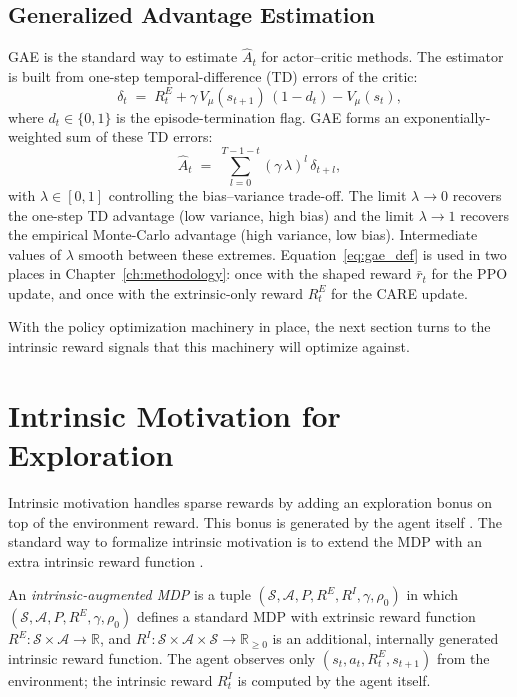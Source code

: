 \subsection{Generalized Advantage Estimation}
\label{sec:gae_background}

GAE \cite{schulman2016gae} is the standard way to estimate $\hat A_t$ for actor--critic methods. The estimator is built from one-step temporal-difference (TD) errors of the critic:
\begin{equation}
\delta_t \;=\; R_t^E + \gamma\, V_\mu(s_{t+1})\,(1 - d_t) - V_\mu(s_t),
\label{eq:td_error}
\end{equation}
where $d_t \in \{0, 1\}$ is the episode-termination flag. GAE forms an exponentially-weighted sum of these TD errors:
\begin{equation}
\hat A_t \;=\; \sum_{l=0}^{T-1-t} (\gamma\, \lambda)^l\, \delta_{t+l},
\label{eq:gae_def}
\end{equation}
with $\lambda \in [0, 1]$ controlling the bias--variance trade-off. The limit $\lambda \to 0$ recovers the one-step TD advantage (low variance, high bias) and the limit $\lambda \to 1$ recovers the empirical Monte-Carlo advantage (high variance, low bias). Intermediate values of $\lambda$ smooth between these extremes. Equation~\eqref{eq:gae_def} is used in two places in Chapter~\ref{ch:methodology}: once with the shaped reward $\bar r_t$ for the PPO update, and once with the extrinsic-only reward $R_t^E$ for the CARE update.

With the policy optimization machinery in place, the next section turns to the intrinsic reward signals that this machinery will optimize against.

\section{Intrinsic Motivation for Exploration}
Intrinsic motivation handles sparse rewards by adding an exploration bonus on top of the environment reward. This bonus is generated by the agent itself \cite{oudeyer2007intrinsic, schmidhuber2010formal}. The standard way to formalize intrinsic motivation is to extend the MDP with an extra intrinsic reward function \cite{oudeyer2007intrinsic, schmidhuber2010formal, aubret2023intrinsic}.

\begin{definition}
\label{def:augmented_mdp}
An \emph{intrinsic-augmented MDP} is a tuple $(\mathcal{S}, \mathcal{A}, P, R^E, R^I, \gamma, \rho_0)$ in which $(\mathcal{S}, \mathcal{A}, P, R^E, \gamma, \rho_0)$ defines a standard MDP with extrinsic reward function $R^E : \mathcal{S} \times \mathcal{A} \to \mathbb{R}$, and $R^I : \mathcal{S} \times \mathcal{A} \times \mathcal{S} \to \mathbb{R}_{\ge 0}$ is an additional, internally generated intrinsic reward function. The agent observes only $(s_t, a_t, R_t^E, s_{t+1})$ from the environment; the intrinsic reward $R_t^I$ is computed by the agent itself.
\end{definition}

